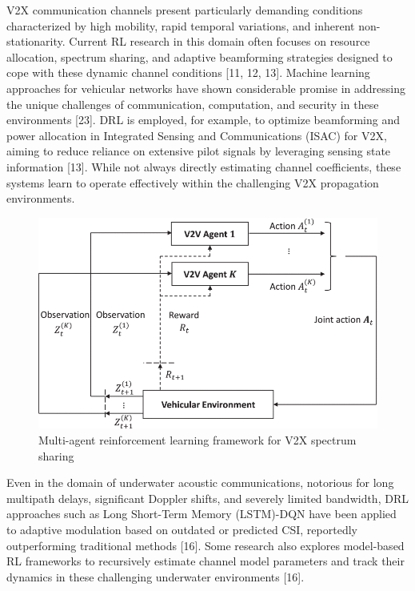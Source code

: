 \documentclass[journal,twocolumn]{IEEEtran}
\begin{document}
V2X communication channels present particularly demanding conditions characterized by high mobility, rapid temporal variations, and inherent non-stationarity. Current RL research in this domain often focuses on resource allocation, spectrum sharing, and adaptive beamforming strategies designed to cope with these dynamic channel conditions [11, 12, 13]. Machine learning approaches for vehicular networks have shown considerable promise in addressing the unique challenges of communication, computation, and security in these environments [23]. DRL is employed, for example, to optimize beamforming and power allocation in Integrated Sensing and Communications (ISAC) for V2X, aiming to reduce reliance on extensive pilot signals by leveraging sensing state information [13]. While not always directly estimating channel coefficients, these systems learn to operate effectively within the challenging V2X propagation environments.

\begin{figure}[!b]
\centering
\includegraphics[width=\columnwidth]{fig_marl_v2x_spectrum_sharing.png}
\caption{Multi-agent reinforcement learning framework for V2X spectrum sharing}
\label{fig:marl_v2x}
\end{figure}

Even in the domain of underwater acoustic communications, notorious for long multipath delays, significant Doppler shifts, and severely limited bandwidth, DRL approaches such as Long Short-Term Memory (LSTM)-DQN have been applied to adaptive modulation based on outdated or predicted CSI, reportedly outperforming traditional methods [16]. Some research also explores model-based RL frameworks to recursively estimate channel model parameters and track their dynamics in these challenging underwater environments [16].
\end{document}

